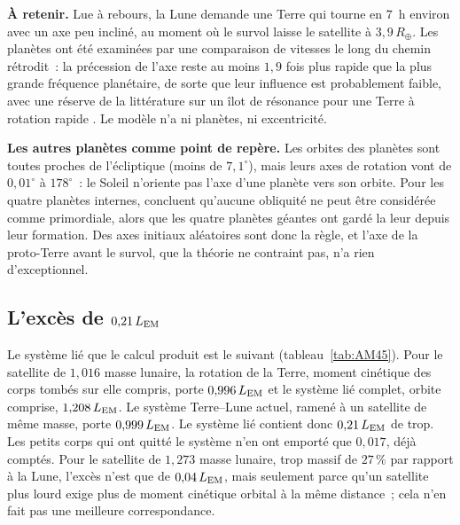 \documentclass[11pt,a4paper]{article}
\newcommand{\Rt}{\ensuremath{R_\oplus}}
\newcommand{\LEM}{\ensuremath{L_{\rm EM}}}
\begin{document}
\textbf{À retenir.} Lue à rebours, la Lune demande une Terre qui tourne en $7$~h environ avec un axe peu incliné, au moment où le survol laisse le satellite à $3{,}9\,\Rt$. Les planètes ont été examinées par une comparaison de vitesses le long du chemin rétrodit~: la précession de l'axe reste au moins $1{,}9$ fois plus rapide que la plus grande fréquence planétaire, de sorte que leur influence est probablement faible, avec une réserve de la littérature sur un îlot de résonance pour une Terre à rotation rapide \citep{LaskarJoutelRobutel1993}. Le modèle n'a ni planètes, ni excentricité.

\textbf{Les autres planètes comme point de repère.} Les orbites des planètes sont toutes proches de l'écliptique (moins de $7{,}1^\circ$), mais leurs axes de rotation vont de $0{,}01^\circ$ à $178^\circ$~: le Soleil n'oriente pas l'axe d'une planète vers son orbite. Pour les quatre planètes internes, \citet{LaskarRobutel1993} concluent qu'aucune obliquité ne peut être considérée comme primordiale, alors que les quatre planètes géantes ont gardé la leur depuis leur formation. Des axes initiaux aléatoires sont donc la règle, et l'axe de la proto-Terre avant le survol, que la théorie ne contraint pas, n'a rien d'exceptionnel.

\subsection{L'excès de $0{,}21\,\LEM$}
\label{sec:excess}

Le système lié que le calcul produit est le suivant (tableau~\ref{tab:AM45}). Pour le satellite de $1{,}016$ masse lunaire, la rotation de la Terre, moment cinétique des corps tombés sur elle compris, porte $0{,}996\,\LEM$ et le système lié complet, orbite comprise, $1{,}208\,\LEM$. Le système Terre--Lune actuel, ramené à un satellite de même masse, porte $0{,}999\,\LEM$. Le système lié contient donc $0{,}21\,\LEM$ de trop. Les petits corps qui ont quitté le système n'en ont emporté que $0{,}017$, déjà comptés. Pour le satellite de $1{,}273$ masse lunaire, trop massif de $27\,\%$ par rapport à la Lune, l'excès n'est que de $0{,}04\,\LEM$, mais seulement parce qu'un satellite plus lourd exige plus de moment cinétique orbital à la même distance~; cela n'en fait pas une meilleure correspondance.
\end{document}
